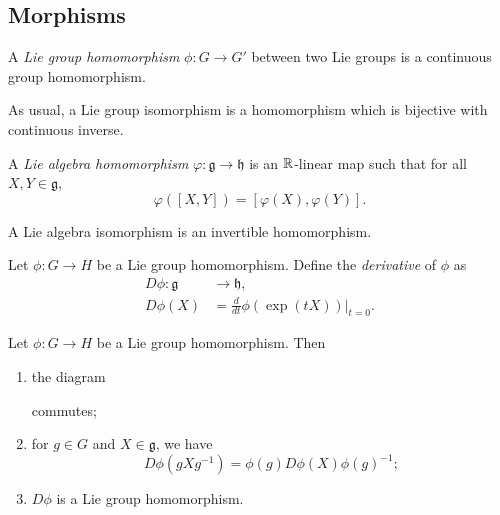 \subsection{Morphisms}

\begin{definition}
    A \emph{Lie group homomorphism} $\phi: G \to G'$ between two Lie groups is a continuous group homomorphism.
\end{definition}

As usual, a Lie group isomorphism is a homomorphism which is bijective with continuous inverse.

\begin{definition}
    A \emph{Lie algebra homomorphism} $\varphi: \mathfrak g \to \mathfrak h$ is an $\mathbb R$-linear map such that for all $X, Y \in \mathfrak g$,
    \[ \varphi([X,Y]) = [\varphi(X), \varphi(Y)]. \]
\end{definition}

A Lie algebra isomorphism is an invertible homomorphism.

\begin{definition}[Derivative]
    Let $\phi: G \to H$ be a Lie group homomorphism. Define the \emph{derivative} of $\phi$ as
    \begin{align*}
        D\phi: \mathfrak g & \to \mathfrak h,                           \\
        D\phi(X)           & = \frac{d}{dt} \phi(\exp(tX))\bigg|_{t=0}.
    \end{align*}
\end{definition}

\begin{theorem}
    Let $\phi: G \to H$ be a Lie group homomorphism. Then
    \begin{enumerate}
        \item the diagram
              \begin{center}
              \end{center}
              commutes;
        \item for $g \in G$ and $X \in \mathfrak g$, we have
              \[ D\phi(gXg^{-1}) = \phi(g)D\phi(X)\phi(g)^{-1}; \]
        \item $D\phi$ is a Lie group homomorphism.
    \end{enumerate}
\end{theorem}

